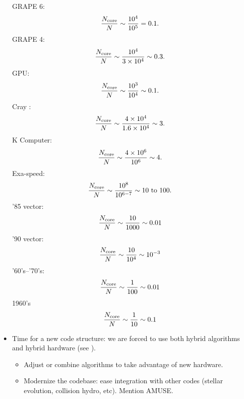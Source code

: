 \documentclass[5p,authoryear]{elsarticle}
\newcommand{\Ncore}{N_{\textnormal{core}}}
\begin{document}
\begin{itemize}
  GRAPE 6:
  \begin{equation}
    \frac{\Ncore}{N} \sim \frac{10^4}{10^5} = 0.1.
  \end{equation}
  GRAPE 4:
  \begin{equation}
    \frac{\Ncore}{N} \sim \frac{10^4}{3 \times 10^4} \sim 0.3.
  \end{equation}
  GPU:
  \begin{equation}
    \frac{\Ncore}{N} \sim \frac{10^3}{10^4} \sim 0.1.
  \end{equation}
  Cray \citep{Nitadori2006}:
  \begin{equation}
    \frac{\Ncore}{N} \sim \frac{4 \times 10^4}{1.6 \times 10^4} \sim 3.
  \end{equation}
  K Computer:
  \begin{equation}
    \frac{\Ncore}{N} \sim \frac{4 \times 10^6}{10^6} \sim 4.
  \end{equation}
  Exa-speed:
  \begin{equation}
    \frac{\Ncore}{N} \sim \frac{10^8}{10^{6-7}} \sim 10 \textnormal{
      to } 100.
  \end{equation}
  '85 vector:
  \begin{equation}
    \frac{\Ncore}{N} \sim \frac{10}{1000} \sim 0.01
  \end{equation}
  '90 vector:
  \begin{equation}
    \frac{\Ncore}{N} \sim \frac{10}{10^4} \sim 10^{-3}
  \end{equation}
  '60's--'70's:
  \begin{equation}
    \frac{\Ncore}{N} \sim \frac{1}{100} \sim 0.01
  \end{equation}
  1960's \citet{vonHoerner1960,vonHoerner1963}
  \begin{equation}
    \frac{\Ncore}{N} \sim \frac{1}{10} \sim 0.1
  \end{equation}
  
\item Time for a new code structure: we are forced to use both hybrid
  algorithms and hybrid hardware (see \citet{Hut1988}).
  \begin{itemize}
  \item Adjust or combine algorithms to take advantage of new
    hardware.
  \item Modernize the codebase: ease integration with other codes (stellar evolution,
    collision hydro, etc).  Mention AMUSE.
  \end{itemize}
\end{itemize}
\end{document}
